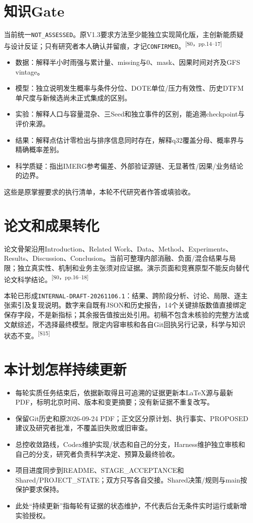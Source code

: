 \documentclass[UTF8,10.5pt,a4paper,fontset=none]{ctexart}
\newcommand{\evi}[1]{\textsuperscript{\color{muted}[#1]}}
\begin{document}
\section*{知识Gate}
当前统一\texttt{NOT\_ASSESSED}。原V1.3要求方法至少能独立实现简化版，主创新能质疑与设计反证；只有研究者本人确认并留痕，才记\texttt{CONFIRMED}。\evi{S0，pp.14--17}
\begin{itemize}
\item 数据：解释半小时雨强与累计量、missing与0、mask、因果时间对齐及GFS vintage。
\item 模型：独立说明发生概率与条件分位、DOTE单位/压力有效性、历史DTFM单尺度与新候选尚未正式集成的区别。
\item 实验：解释人口与容量混杂、三Seed和独立事件的区别，能追溯checkpoint与评价来源。
\item 结果：解释点估计零检出与排序信息同时存在，解释q32覆盖分母、概率界与精确概率差别。
\item 科学质疑：指出IMERG参考偏差、外部验证源链、无显著性/因果/业务结论的边界。
\end{itemize}
这些是原掌握要求的执行清单，本轮不代研究者作答或填验收。

\section*{论文和成果转化}
论文骨架沿用Introduction、Related Work、Data、Method、Experiments、Results、Discussion、Conclusion。当前可整理内部消融、负面/混合结果与局限；独立真实性、机制和业务主张须对应证据。演示页面和竞赛原型不能反向替代论文科学结论。\evi{S0，pp.16--18}

本轮已形成\texttt{INTERNAL-DRAFT-20261106.1}：结果、跨阶段分析、讨论、局限、逐主张索引及复现说明。数字来自既有JSON和历史报告，14个关键排版数值直接绑定保存字段，不是新指标；其余报告值按出处引用。初稿不包含未核验的完整方法或文献综述，不选择最终模型。限定内容审核和各自Git回执另行记录，科学与知识状态不变。\evi{S15}

\section*{本计划怎样持续更新}
\begin{itemize}
\item 每轮实质任务结束后，依据新取得且可追溯的证据更新本LaTeX源与最新PDF，标明北京时间、版本和变更摘要；没有新证据不重复改写。
\item 保留Git历史和原2026-09-24 PDF；正文区分原计划、执行事实、PROPOSED建议及研究者批准，不覆盖旧失败或旧审查。
\item 总控收敛路线，Codex维护实现/状态和自己的分支，Harness维护独立审核和自己的分支，研究者负责科学决定、预算及最终验收。
\item 项目进度同步到README、STAGE\_ACCEPTANCE和Shared/PROJECT\_STATE；双方只写各自交接。Shared决策/规则与main按保护要求保持。
\item 此处“持续更新”指每轮有证据的状态维护，不代表后台无条件实时运行或新增实验授权。
\end{itemize}
\end{document}

